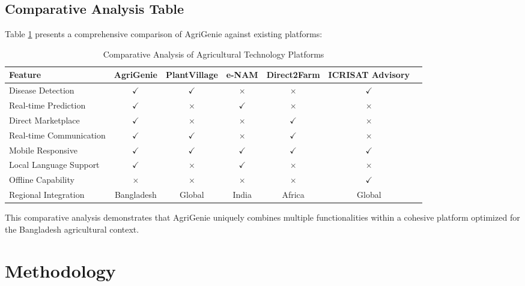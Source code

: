 \documentclass[12pt,a4paper]{report}
\begin{document}
\section{Comparative Analysis Table}

Table \ref{table:comparative_analysis} presents a comprehensive comparison of AgriGenie against existing platforms:

\begin{table}[h]
\centering
\caption{Comparative Analysis of Agricultural Technology Platforms}
\label{table:comparative_analysis}
\begin{tabular}{|l|c|c|c|c|c|c|}
\hline
\textbf{Feature} & \textbf{AgriGenie} & \textbf{PlantVillage} & \textbf{e-NAM} & \textbf{Direct2Farm} & \textbf{ICRISAT Advisory} \\
\hline
Disease Detection & $\checkmark$ & $\checkmark$ & $\times$ & $\times$ & $\checkmark$ \\
\hline
Real-time Prediction & $\checkmark$ & $\times$ & $\checkmark$ & $\times$ & $\times$ \\
\hline
Direct Marketplace & $\checkmark$ & $\times$ & $\times$ & $\checkmark$ & $\times$ \\
\hline
Real-time Communication & $\checkmark$ & $\checkmark$ & $\times$ & $\checkmark$ & $\times$ \\
\hline
Mobile Responsive & $\checkmark$ & $\checkmark$ & $\checkmark$ & $\checkmark$ & $\checkmark$ \\
\hline
Local Language Support & $\checkmark$ & $\times$ & $\checkmark$ & $\times$ & $\times$ \\
\hline
Offline Capability & $\times$ & $\times$ & $\times$ & $\times$ & $\checkmark$ \\
\hline
Regional Integration & Bangladesh & Global & India & Africa & Global \\
\hline
\end{tabular}
\end{table}

This comparative analysis demonstrates that AgriGenie uniquely combines multiple functionalities within a cohesive platform optimized for the Bangladesh agricultural context.

\newpage

\chapter{Methodology}
\end{document}
